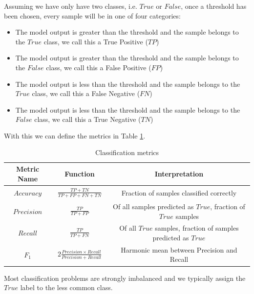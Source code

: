Assuming we have only have two classes, i.e. $True$ or $False$, once a threshold has been chosen, every sample will be in one of four categories:
\begin{itemize}
    \item The model output is greater than the threshold and the sample belongs to the $True$ class, we call this a True Positive ($TP$)
    \item The model output is greater than the threshold and the sample belongs to the $False$ class, we call this a False Positive ($FP$)
    \item The model output is less than the threshold and the sample belongs to the $True$ class, we call this a False Negative ($FN$)
    \item The model output is less than the threshold and the sample belongs to the $False$ class, we call this a True Negative ($TN$)
\end{itemize}
With this we can define the metrics in Table \ref{table:classification_metrics}.
\begin{table}
    \centering
    \renewcommand{\arraystretch}{1.3}
    \begin{tabular}{|c| c| c|}
    Metric Name & Function & Interpretation \\[0.5ex] \hline
    $Accuracy$ & $\begin{array} {lcl} \frac{TP + TN}{TP + FP + FN + TN}\end{array}$ & Fraction of samples classified correctly  \\ [0.5ex]
    $Precision$ & $\begin{array} {lcl} \frac{TP}{TP + FP}\end{array}$ & Of all samples predicted as $True$, fraction of $True$ samples \\ [0.5ex]
    $Recall$ & $\begin{array} {lcl} \frac{TP}{TP + FN}\end{array}$ & Of all $True$ samples, fraction of samples predicted as $True$ \\ [0.5ex]
    $F_1$ & $\begin{array} {lcl}2\frac{Precision \times Recall}{Precision + Recall} \end{array}$ & Harmonic mean between Precision and Recall \\ [0.5ex]
    \end{tabular}
    \caption{Classification metrics}
    \label{table:classification_metrics}
\end{table}
Most classification problems are strongly imbalanced and we typically assign the $True$ label to the less common class.

